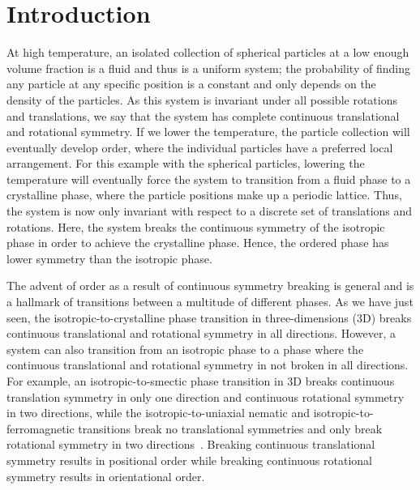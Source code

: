 \chapter{Introduction}\label{c:1}
At high temperature, an isolated collection of spherical particles at a low enough volume fraction is a fluid and thus is a uniform system; the probability of finding any particle at any specific position is a constant and only depends on the density of the particles.
As this system is invariant under all possible rotations and translations, we say that the system has complete continuous translational and rotational symmetry.
If we lower the temperature, the particle collection will eventually develop order, where the individual particles have a preferred local arrangement.
For this example with the spherical particles, lowering the temperature will eventually force the system to transition from a fluid phase to a crystalline phase, where the particle positions make up a periodic lattice.
Thus, the system is now only invariant with respect to a discrete set of translations and rotations.
Here, the system breaks the continuous symmetry of the isotropic phase in order to achieve the crystalline phase.
Hence, the ordered phase has lower symmetry than the isotropic phase.

The advent of order as a result of continuous symmetry breaking is general and is a hallmark of transitions between a multitude of different phases.
As we have just seen, the isotropic-to-crystalline phase transition in three-dimensions (3D) breaks continuous translational and rotational symmetry in all directions.
However, a system can also transition from an isotropic phase to a phase where the continuous translational and rotational symmetry in not broken in all directions.
For example, an isotropic-to-smectic phase transition in 3D breaks continuous translation symmetry in only one direction and continuous rotational symmetry in two directions, while the isotropic-to-uniaxial nematic and isotropic-to-ferromagnetic transitions break no translational symmetries and only break rotational symmetry in two directions~\cite{RN175}. Breaking continuous translational symmetry results in positional order while breaking continuous rotational symmetry results in orientational order.

